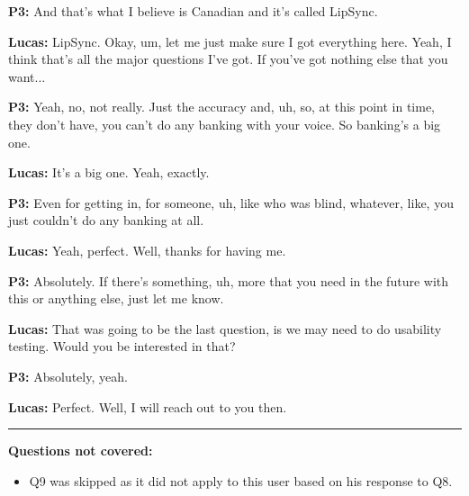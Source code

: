 \textbf{P3:} And that's what I believe is Canadian and it's called LipSync. 

\textbf{Lucas:} LipSync. Okay, um, let me just make sure I got everything here. Yeah, I think that's all the major questions I've got. If you've got nothing else that you want... 

\textbf{P3:} Yeah, no, not really. Just the accuracy and, uh, so, at this point in time, they don't have, you can't do any banking with your voice. So banking's a big one. 

\textbf{Lucas:} It's a big one. Yeah, exactly. 

\textbf{P3:} Even for getting in, for someone, uh, like who was blind, whatever, like, you just couldn't do any banking at all. 

\textbf{Lucas:} Yeah, perfect. Well, thanks for having me. 

\textbf{P3:} Absolutely. If there's something, uh, more that you need in the future with this or anything else, just let me know. 

\textbf{Lucas:} That was going to be the last question, is we may need to do usability testing. Would you be interested in that? 

\textbf{P3:} Absolutely, yeah. 

\textbf{Lucas:} Perfect. Well, I will reach out to you then. 

\bigskip
\hrule
\bigskip

\textbf{Questions not covered:}
\begin{itemize}
  \item Q9 was skipped as it did not apply to this user based on his response to Q8.
\end{itemize}
